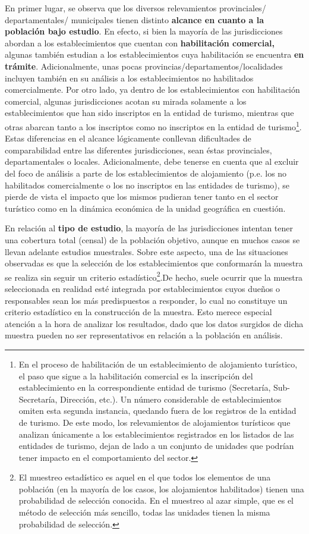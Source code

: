 \documentclass[
]{book}
\begin{document}
En primer lugar, se observa que los diversos relevamientos provinciales/ departamentales/ municipales tienen distinto \textbf{alcance en cuanto a la población bajo estudio}. En efecto, si bien la mayoría de las jurisdicciones abordan a los establecimientos que cuentan con \textbf{habilitación comercial,} algunas también estudian a los establecimientos cuya habilitación se encuentra \textbf{en trámite}. Adicionalmente, unas pocas provincias/departamentos/localidades incluyen también en su análisis a los establecimientos no habilitados comercialmente. Por otro lado, ya dentro de los establecimientos con habilitación comercial, algunas jurisdicciones acotan su mirada solamente a los establecimientos que han sido inscriptos en la entidad de turismo, mientras que otras abarcan tanto a los inscriptos como no inscriptos en la entidad de turismo\footnote{En el proceso de habilitación de un establecimiento de alojamiento turístico, el paso que sigue a la habilitación comercial es la inscripción del establecimiento en la correspondiente entidad de turismo (Secretaría, Sub-Secretaría, Dirección, etc.). Un número considerable de establecimientos omiten esta segunda instancia, quedando fuera de los registros de la entidad de turismo. De este modo, los relevamientos de alojamientos turísticos que analizan únicamente a los establecimientos registrados en los listados de las entidades de turismo, dejan de lado a un conjunto de unidades que podrían tener impacto en el comportamiento del sector.}. Estas diferencias en el alcance lógicamente conllevan dificultades de comparabilidad entre las diferentes jurisdicciones, sean éstas provinciales, departamentales o locales. Adicionalmente, debe tenerse en cuenta que al excluir del foco de análisis a parte de los establecimientos de alojamiento (p.e. los no habilitados comercialmente o los no inscriptos en las entidades de turismo), se pierde de vista el impacto que los mismos pudieran tener tanto en el sector turístico como en la dinámica económica de la unidad geográfica en cuestión.

En relación al \textbf{tipo de estudio}, la mayoría de las jurisdicciones intentan tener una cobertura total (censal) de la población objetivo, aunque en muchos casos se llevan adelante estudios muestrales. Sobre este aspecto, una de las situaciones observadas es que la selección de los establecimientos que conformarán la muestra se realiza sin seguir un criterio estadístico\footnote{El muestreo estadístico es aquel en el que todos los elementos de una población (en la mayoría de los casos, los alojamientos habilitados) tienen una probabilidad de selección conocida. En el muestreo al azar simple, que es el método de selección más sencillo, todas las unidades tienen la misma probabilidad de selección.}.De hecho, suele ocurrir que la muestra seleccionada en realidad esté integrada por establecimientos cuyos dueños o responsables sean los más predispuestos a responder, lo cual no constituye un criterio estadístico en la construcción de la muestra. Esto merece especial atención a la hora de analizar los resultados, dado que los datos surgidos de dicha muestra pueden no ser representativos en relación a la población en análisis.
\end{document}
